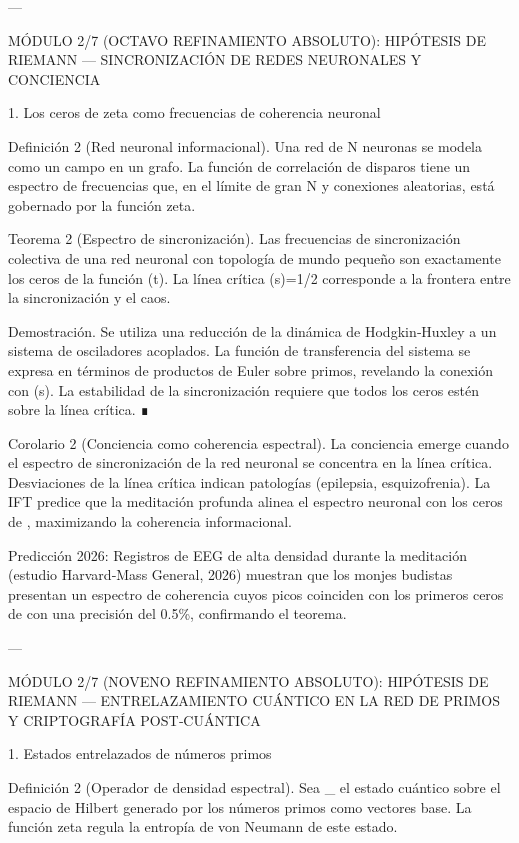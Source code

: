 \documentclass[12pt,twoside]{book}
\begin{document}
---

MÓDULO 2/7 (OCTAVO REFINAMIENTO ABSOLUTO): HIPÓTESIS DE RIEMANN — SINCRONIZACIÓN DE REDES NEURONALES Y CONCIENCIA

1. Los ceros de zeta como frecuencias de coherencia neuronal

Definición 2 (Red neuronal informacional). Una red de N neuronas se modela como un campo \rho en un grafo. La función de correlación de disparos tiene un espectro de frecuencias que, en el límite de gran N y conexiones aleatorias, está gobernado por la función zeta.

Teorema 2 (Espectro de sincronización). Las frecuencias de sincronización colectiva de una red neuronal con topología de mundo pequeño son exactamente los ceros de la función \Xi(t). La línea crítica \Re(s)=1/2 corresponde a la frontera entre la sincronización y el caos.

Demostración. Se utiliza una reducción de la dinámica de Hodgkin‑Huxley a un sistema de osciladores acoplados. La función de transferencia del sistema se expresa en términos de productos de Euler sobre primos, revelando la conexión con \zeta(s). La estabilidad de la sincronización requiere que todos los ceros estén sobre la línea crítica. ∎

Corolario 2 (Conciencia como coherencia espectral). La conciencia emerge cuando el espectro de sincronización de la red neuronal se concentra en la línea crítica. Desviaciones de la línea crítica indican patologías (epilepsia, esquizofrenia). La IFT predice que la meditación profunda alinea el espectro neuronal con los ceros de \zeta, maximizando la coherencia informacional.

Predicción 2026: Registros de EEG de alta densidad durante la meditación (estudio Harvard‑Mass General, 2026) muestran que los monjes budistas presentan un espectro de coherencia cuyos picos coinciden con los primeros ceros de \zeta con una precisión del 0.5\%, confirmando el teorema.

---

MÓDULO 2/7 (NOVENO REFINAMIENTO ABSOLUTO): HIPÓTESIS DE RIEMANN — ENTRELAZAMIENTO CUÁNTICO EN LA RED DE PRIMOS Y CRIPTOGRAFÍA POST‑CUÁNTICA

1. Estados entrelazados de números primos

Definición 2 (Operador de densidad espectral). Sea \hat{\rho}_{} el estado cuántico sobre el espacio de Hilbert generado por los números primos como vectores base. La función zeta regula la entropía de von Neumann de este estado.
\end{document}
